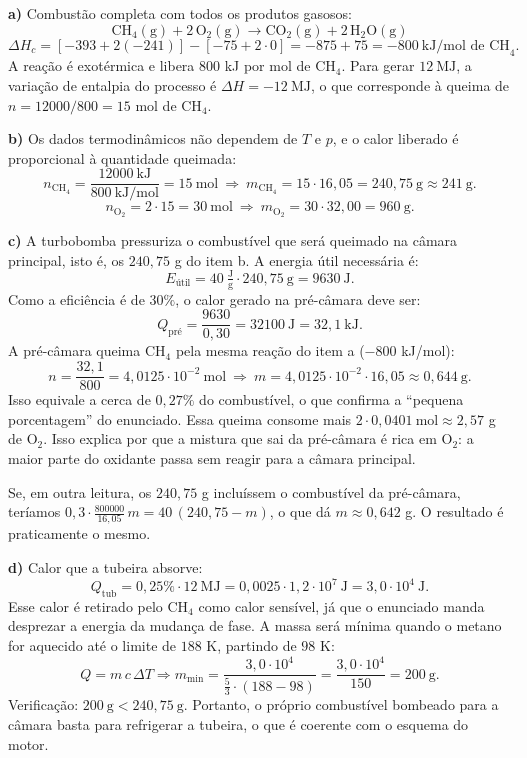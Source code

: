 \documentclass{article}%
\begin{document}
\textbf{a)} Combustão completa com todos os produtos gasosos:
\[
\text{CH}_4(\text{g})+2\,\text{O}_2(\text{g})\longrightarrow \text{CO}_2(\text{g})+2\,\text{H}_2\text{O}(\text{g})
\]
\[
\Delta H_c=\left[-393+2(-241)\right]-\left[-75+2\cdot 0\right]=-875+75=-800\ \text{kJ/mol de CH}_4 .
\]
A reação é exotérmica e libera $800$ kJ por mol de CH$_4$. Para gerar $12\ \text{MJ}$, a variação de entalpia do processo é $\Delta H=-12\ \text{MJ}$, o que corresponde à queima de $n=12000/800=15$ mol de CH$_4$.

\textbf{b)} Os dados termodinâmicos não dependem de $T$ e $p$, e o calor liberado é proporcional à quantidade queimada:
\[
n_{\text{CH}_4}=\frac{12000\ \text{kJ}}{800\ \text{kJ/mol}}=15\ \text{mol}\ \Rightarrow\ m_{\text{CH}_4}=15\cdot 16{,}05=240{,}75\ \text{g}\approx 241\ \text{g}.
\]
\[
n_{\text{O}_2}=2\cdot 15=30\ \text{mol}\ \Rightarrow\ m_{\text{O}_2}=30\cdot 32{,}00=960\ \text{g}.
\]

\textbf{c)} A turbobomba pressuriza o combustível que será queimado na câmara principal, isto é, os $240{,}75$ g do item b. A energia útil necessária é:
\[
E_{\text{útil}}=40\ \tfrac{\text{J}}{\text{g}}\cdot 240{,}75\ \text{g}=9630\ \text{J}.
\]
Como a eficiência é de $30\%$, o calor gerado na pré-câmara deve ser:
\[
Q_{\text{pré}}=\frac{9630}{0{,}30}=32100\ \text{J}=32{,}1\ \text{kJ}.
\]
A pré-câmara queima CH$_4$ pela mesma reação do item a ($-800$ kJ/mol):
\[
n=\frac{32{,}1}{800}=4{,}0125\cdot 10^{-2}\ \text{mol}\ \Rightarrow\ m=4{,}0125\cdot 10^{-2}\cdot 16{,}05\approx 0{,}644\ \text{g}.
\]
Isso equivale a cerca de $0{,}27\%$ do combustível, o que confirma a ``pequena porcentagem'' do enunciado. Essa queima consome mais $2\cdot 0{,}0401\ \text{mol}\approx 2{,}57$ g de O$_2$. Isso explica por que a mistura que sai da pré-câmara é rica em O$_2$: a maior parte do oxidante passa sem reagir para a câmara principal.

Se, em outra leitura, os $240{,}75$ g incluíssem o combustível da pré-câmara, teríamos $0{,}3\cdot\tfrac{800000}{16{,}05}\,m=40\,(240{,}75-m)$, o que dá $m\approx 0{,}642$ g. O resultado é praticamente o mesmo.

\textbf{d)} Calor que a tubeira absorve:
\[
Q_{\text{tub}}=0{,}25\%\cdot 12\ \text{MJ}=0{,}0025\cdot 1{,}2\cdot 10^{7}\ \text{J}=3{,}0\cdot 10^{4}\ \text{J}.
\]
Esse calor é retirado pelo CH$_4$ como calor sensível, já que o enunciado manda desprezar a energia da mudança de fase. A massa será mínima quando o metano for aquecido até o limite de $188$ K, partindo de $98$ K:
\[
Q=m\,c\,\Delta T \Rightarrow m_{\min}=\frac{3{,}0\cdot 10^{4}}{\tfrac{5}{3}\cdot(188-98)}=\frac{3{,}0\cdot 10^{4}}{150}=200\ \text{g}.
\]
Verificação: $200\ \text{g}<240{,}75\ \text{g}$. Portanto, o próprio combustível bombeado para a câmara basta para refrigerar a tubeira, o que é coerente com o esquema do motor.
\end{document}

